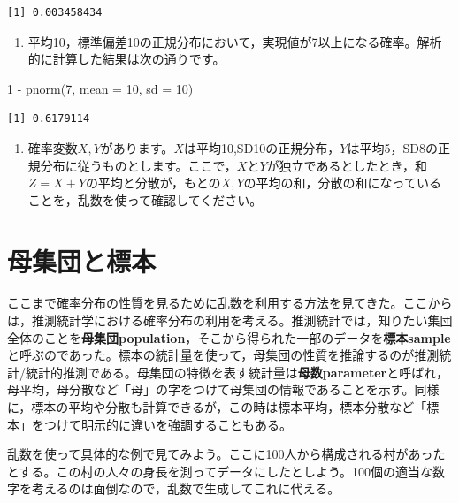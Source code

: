 \documentclass[
  a4paper,
]{ltjsbook}
\newenvironment{Shaded}{\begin{snugshade}}{\end{snugshade}}
\newcommand{\AttributeTok}[1]{\textcolor[rgb]{0.40,0.45,0.13}{#1}}
\newcommand{\DecValTok}[1]{\textcolor[rgb]{0.68,0.00,0.00}{#1}}
\newcommand{\FunctionTok}[1]{\textcolor[rgb]{0.28,0.35,0.67}{#1}}
\newcommand{\NormalTok}[1]{\textcolor[rgb]{0.00,0.23,0.31}{#1}}
\newcommand{\SpecialCharTok}[1]{\textcolor[rgb]{0.37,0.37,0.37}{#1}}
\providecommand{\tightlist}{%
  \setlength{\itemsep}{0pt}\setlength{\parskip}{0pt}}\usepackage{longtable,booktabs,array}
\begin{document}
\begin{verbatim}
[1] 0.003458434
\end{verbatim}

\begin{enumerate}
\def\labelenumi{\arabic{enumi}.}
\setcounter{enumi}{3}
\tightlist
\item
  平均10，標準偏差10の正規分布において，実現値が7以上になる確率。解析的に計算した結果は次の通りです。
\end{enumerate}

\begin{Shaded}
\begin{Highlighting}[]
\DecValTok{1} \SpecialCharTok{{-}} \FunctionTok{pnorm}\NormalTok{(}\DecValTok{7}\NormalTok{, }\AttributeTok{mean =} \DecValTok{10}\NormalTok{, }\AttributeTok{sd =} \DecValTok{10}\NormalTok{)}
\end{Highlighting}
\end{Shaded}

\begin{verbatim}
[1] 0.6179114
\end{verbatim}

\begin{enumerate}
\def\labelenumi{\arabic{enumi}.}
\setcounter{enumi}{4}
\tightlist
\item
  確率変数\(X,Y\)があります。\(X\)は平均10,SD10の正規分布，\(Y\)は平均5，SD8の正規分布に従うものとします。ここで，\(X\)と\(Y\)が独立であるとしたとき，和\(Z=X+Y\)の平均と分散が，もとの\(X,Y\)の平均の和，分散の和になっていることを，乱数を使って確認してください。
\end{enumerate}

\section{母集団と標本}\label{ux6bcdux96c6ux56e3ux3068ux6a19ux672c}

ここまで確率分布の性質を見るために乱数を利用する方法を見てきた。ここからは，推測統計学における確率分布の利用を考える。推測統計では，知りたい集団全体のことを\textbf{母集団population}，そこから得られた一部のデータを\textbf{標本sample}と呼ぶのであった。標本の統計量を使って，母集団の性質を推論するのが推測統計/統計的推測である。母集団の特徴を表す統計量は\textbf{母数parameter}と呼ばれ，母平均，母分散など「母」の字をつけて母集団の情報であることを示す。同様に，標本の平均や分散も計算できるが，この時は標本平均，標本分散など「標本」をつけて明示的に違いを強調することもある。

乱数を使って具体的な例で見てみよう。ここに100人から構成される村があったとする。この村の人々の身長を測ってデータにしたとしよう。100個の適当な数字を考えるのは面倒なので，乱数で生成してこれに代える。
\end{document}
